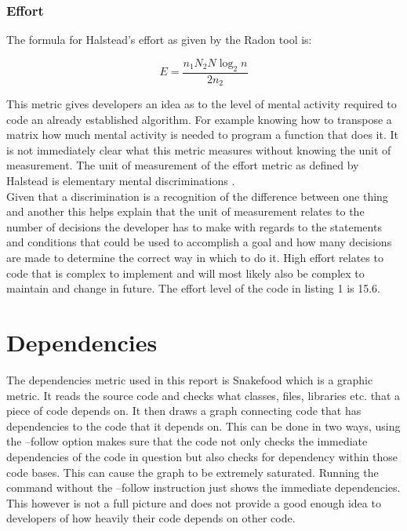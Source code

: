 \documentclass[11pt,journal, a4paper]{IEEEtran}
\begin{document}
\subsubsection{Effort}
\noindent
The formula for Halstead's effort as given by the Radon tool is:


\begin{equation}
 E = \frac{n_{1}N_{2}N\log_2n}{2n_{2}}
\end{equation}

\noindent
This metric gives developers an idea as to the level of mental activity required to code an already established algorithm. For example knowing how to transpose a matrix how much mental activity is needed to program a function that does it. It is not immediately clear what this metric measures without knowing the unit of measurement. The unit of measurement of the effort metric as defined by Halstead is elementary mental discriminations \cite{HALS}. \\

\noindent
Given that a discrimination is a recognition of the difference between one thing and another this helps explain that the unit of measurement relates to the number of decisions the developer has to make with regards to the statements and conditions that could be used to accomplish a goal and how many decisions are made to determine the correct way in which to do it. High effort relates to code that is complex to implement and will most likely also be complex to maintain and change in future. The effort level of the code in listing 1 is 15.6. 

\section{Dependencies}
\noindent
The dependencies metric used in this report is Snakefood which is a graphic metric. It reads the source code and checks what classes, files, libraries etc. that a piece of code depends on. It then draws a graph connecting code that has dependencies to the code that it depends on. This can be done in two ways, using the --follow option makes sure that the code not only checks the immediate dependencies of the code in question but also checks for dependency within those code bases. This can cause the graph to be extremely saturated. Running the command without the --follow instruction just shows the immediate dependencies. This however is not a full picture and does not provide a good enough idea to developers of how heavily their code depends on other code. \\
\end{document}
